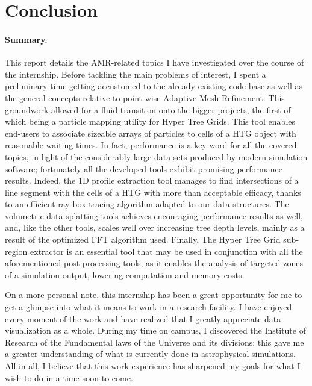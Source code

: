 \documentclass[
	a4paper,
	12pt,
	raggedright,
	twoside
]{tufte-style-article}
\theoremstyle{definition}
\theoremstyle{remark}
\begin{document}
\begin{figure}
    \centering
    
\end{figure}

\section{Conclusion}
\paragraph{Summary.} This report details the \Gls{AMR}-related topics I have investigated over the course of the internship.  Before tackling the main problems of interest, I spent a preliminary time getting accustomed to the already existing code base as well as the general concepts relative to point-wise Adaptive Mesh Refinement. This groundwork allowed for a fluid transition onto the bigger projects, the first of which being a particle mapping utility for Hyper Tree Grids. This tool enables end-users to associate sizeable arrays of particles to cells of a \Gls{HTG} object with reasonable waiting times. In fact, performance is a key word for all the covered topics, in light of the considerably large data-sets produced by modern simulation software; fortunately all the developed tools exhibit promising performance results. Indeed, the 1D profile extraction tool manages to find intersections of a line segment with the cells of a \Gls{HTG} with more than acceptable efficacy, thanks to an efficient ray-box tracing algorithm adapted to our data-structures. The volumetric data splatting tools achieves encouraging performance results as well, and, like the other tools, scales well over increasing tree depth levels, mainly as a result of the optimized \Gls{FFT} algorithm used. Finally, The Hyper Tree Grid sub-region extractor is an essential tool that may be used in conjunction with all the aforementioned post-processing tools, as it enables the analysis of targeted zones of a simulation output, lowering computation and memory costs.

On a more personal note, this internship has been a great opportunity for me to get a glimpse into what it means to work in a research facility. I have enjoyed every moment of the work and have realized that I greatly appreciate data visualization as a whole.  During my time on campus, I discovered the Institute of Research of the Fundamental laws of the Universe and its divisions; this gave me a greater understanding of what is currently done in astrophysical simulations.  All in all, I believe that this work experience has sharpened my goals for what I wish to do in a time soon to come.
\end{document}

